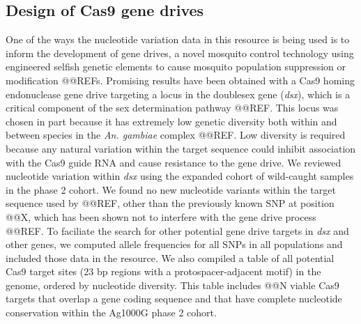\documentclass[a4paper,11pt,abstracton,hidelinks]{scrartcl}
\begin{document}
\subsection*{Design of Cas9 gene drives}


%
One of the ways the nucleotide variation data in this resource is being used is to inform the development of gene drives, a novel mosquito control technology using engineered selfish genetic elements to cause mosquito population suppression or modification @@REFs.
%
Promising results have been obtained with a Cas9 homing endonuclease gene drive targeting a locus in the doublesex gene (\textit{dsx}), which is a critical component of the sex determination pathway @@REF.
%
This locus was chosen in part because it has extremely low genetic diversity both within and between species in the \textit{An. gambiae} complex @@REF.
%
Low diversity is required because any natural variation within the target sequence could inhibit association with the Cas9 guide RNA and cause resistance to the gene drive.
%
We reviewed nucleotide variation within \textit{dsx} using the expanded cohort of wild-caught samples in the phase 2 cohort.
%
We found no new nucleotide variants within the target sequence used by @@REF, other than the previously known SNP at position @@X, which has been shown not to interfere with the gene drive process @@REF.
%
To faciliate the search for other potential gene drive targets in \textit{dsx} and other genes, we computed allele frequencies for all SNPs in all populations and included those data in the resource.
%
We also compiled a table of all potential Cas9 target sites (23 bp regions with a protospacer-adjacent motif) in the genome, ordered by nucleotide diversity.
%
This table includes @@N viable Cas9 targets that overlap a gene coding sequence and that have complete nucleotide conservation within the Ag1000G phase 2 cohort.
\end{document}

